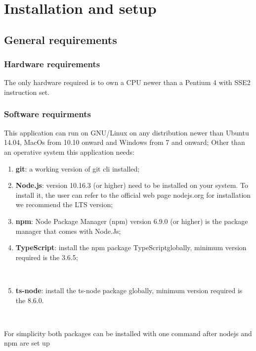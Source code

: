 \section{Installation and setup}
\subsection{General requirements}
\subsubsection{Hardware requirements}
The only hardware required is to own a CPU newer than a Pentium 4 with SSE2 instruction set. 
\subsubsection{Software requirments }
This application can run on GNU/Linux on any distribution newer than Ubuntu 14.04, MacOs from 10.10 onward and Windows from 7 and onward; Other than an operative system this application needs: 
\begin{enumerate}
	\item \textbf{git}: a working version of git cli installed;
	\item \textbf{Node.js}: version 10.16.3 (or higher) need to be installed on your system. To install it, the user can refer to the official web page nodejs.org for installation we recommend the LTS version;
	\item \textbf{npm}: Node Package Manager (npm) version 6.9.0 (or higher) is the package manager that comes with Node.Js; 
	\item \textbf{TypeScript}: install the npm package TypeScript\glo globally, minimum version required is the 3.6.5; \newline\newline \centerline{}\\
	\item \textbf{ts-node}: install the ts-node package globally, minimum version required is the 8.6.0. \newline\newline \centerline{}\\
\end{enumerate}
For simplicity both packages can be installed with one command after nodejs and npm are set up\\\\
\centerline{}\\
